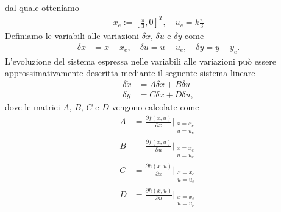 \documentclass[a4paper, 11pt]{article}
\begin{document}
%
dal quale otteniamo
%
\begin{align}
	x_e := \left[\frac{\pi}{3}, 0\right]^T,  \quad u_e = k\frac{\pi}{3}\label{eq:equilibirum_pair}
\end{align}
%
Definiamo le variabili alle variazioni $\delta x$, $\delta u$ e $\delta y$ come 
%
\begin{align*}
	\delta x & = x-x_e, 
	\quad
	\delta u = u-u_e, 
	\quad
	\delta y = y-y_e.
\end{align*}
%
L'evoluzione del sistema espressa nelle variabili alle variazioni pu\`o essere approssimativamente descritta mediante il seguente sistema lineare
%
\begin{subequations}\label{eq:linearized_system}
	\begin{align}
		\delta \dot{x} & = A\delta x + B\delta u
		\\
		\delta y       & = C\delta x + D\delta u,
	\end{align}
\end{subequations}
%
dove le matrici $A$, $B$, $C$ e $D$ vengono calcolate come
%
\begin{subequations}\label{eq:matrices}
	\begin{align}
		A & = \frac{\partial f(x, u)}{\partial x} \Bigg|_{\begin{smallmatrix}
			                                                  x = x_e
			                                                  \\
			                                                  u = u_e \end{smallmatrix}}
		\\
		B & = \frac{\partial f(x, u)}{\partial u} \Bigg|_{\begin{smallmatrix}
			                                                  x = x_e
			                                                  \\
			                                                  u = u_e \end{smallmatrix}}
		\\
		C & = \frac{\partial h(x, u)}{\partial x} \Bigg|_{\begin{smallmatrix}
			                                                  x = x_e
			                                                  \\
			                                                  u = u_e \end{smallmatrix}}
		\\
		D & = \frac{\partial h(x, u)}{\partial u} \Bigg|_{\begin{smallmatrix}
			                                                  x = x_e
			                                                  \\
			                                                  u = u_e \end{smallmatrix}}
	\end{align}
\end{subequations}
%
\end{document}
